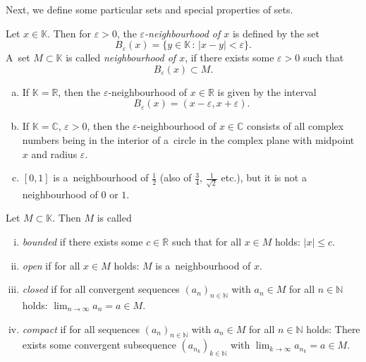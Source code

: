 
Next, we define some particular sets and special properties of sets.
\begin{Definition}
 Let $x\in \mathbb{K}$. Then for $\varepsilon>0$, the \emph{$\varepsilon$-neighbourhood of $x$} is defined by the set
\[B_{\varepsilon}(x)=\{y\in \mathbb{K}\,:\,|x-y|<\varepsilon\}.\]
A~set $M\subset \mathbb{K}$ is called \emph{neighbourhood of $x$}, if there exists some $\varepsilon>0$ such that
\[B_{\varepsilon}(x)\subset M.\]
\end{Definition}
\begin{example}
 \begin{enumerate}[(a)]
  \item If $\mathbb{K}=\mathbb{R}$, then the $\varepsilon$-neighbourhood of $x\in\mathbb{R}$ is given by the interval
\[B_{\varepsilon}(x)=(x-\varepsilon,x+\varepsilon).\]
\item If $\mathbb{K}=\mathbb{C}$, $\varepsilon>0$, then the $\varepsilon$-neighbourhood of $x\in\mathbb{C}$ consists of all complex numbers being in the interior of a~circle in the complex plane with midpoint $x$ and radius $\varepsilon$.
\item $[0,1]$ is a~neighbourhood of $\frac12$ (also of $\frac34$, $\frac1{\sqrt{2}}$ etc.), but it is not a neighbourhood of $0$ or $1$.
 \end{enumerate}
\end{example}

\begin{Definition}\label{def:clopco}
 Let $M\subset \mathbb{K}$. Then $M$ is called
\begin{enumerate}[(i)]
 \item \emph{bounded} if there exists some $c \in \mathbb{R}$ such that for all $x\in M$ holds: $|x|\leq c$. 
 \item \emph{open} if for all $x\in M$ holds: $M$ is a~neighbourhood of $x$.
 \item \emph{closed} if for all convergent sequences $(a_n)_{n\in\mathbb{N}}$ with $a_n\in M$ for all $n\in\mathbb{N}$ holds: $\lim_{n\to\infty}a_n=a\in M$.
 \item \emph{compact}  if for all sequences $(a_n)_{n\in\mathbb{N}}$ with $a_n\in M$ for all $n\in\mathbb{N}$ holds: There exists some convergent subsequence $(a_{n_k})_{k\in\mathbb{N}}$ with $\lim_{k\to\infty}a_{n_k}=a\in M$.
\end{enumerate}
\end{Definition}

